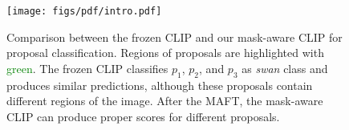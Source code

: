 \begin{figure}
\begin{center}
   \texttt{[image: figs/pdf/intro.pdf]}
\end{center}
\vspace{-3mm}
   \caption{
    Comparison between the frozen CLIP and our mask-aware CLIP for proposal classification. Regions of proposals are highlighted with \textcolor{green}{green}. The frozen CLIP classifies $p_1$, $p_2$, and $p_3$ as \textit{swan} class and produces similar predictions, although these proposals contain different regions of the image. After the MAFT, the mask-aware CLIP can produce proper scores for different proposals.
   }
\label{fig:intro}
\end{figure}
